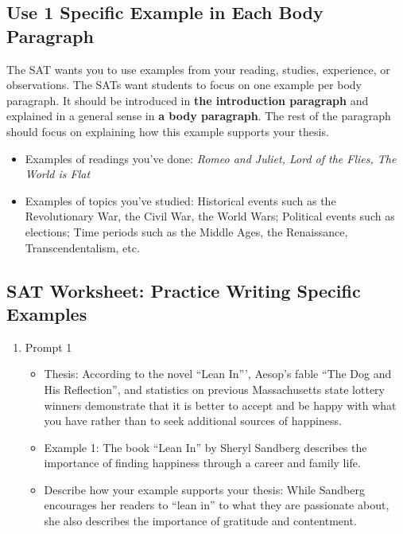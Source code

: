 \begin{enumerate}
\begin{enumerate}
\begin{itemize}
\end{itemize}

\subsection{Use 1 Specific Example in Each Body Paragraph}

The SAT wants you to use examples from your reading, studies, experience, or observations. The SATs want students to focus on one example per body paragraph. It should be introduced in \textbf{the introduction paragraph} and explained in a general sense in \textbf{a body paragraph}. The rest of the paragraph should focus on explaining how this example supports your thesis.

\begin{itemize}
\item Examples of readings you’ve done: \textit{Romeo and Juliet, Lord of the Flies, The World is Flat}
\item Examples of topics you’ve studied: Historical events such as the Revolutionary War, the Civil War, the World Wars; Political events such as elections; Time periods such as the Middle Ages, the Renaissance, Transcendentalism, etc.
\end{itemize}

\end{enumerate}

\subsection{SAT Worksheet: Practice Writing Specific Examples}
\begin{enumerate}
\item Prompt 1

\begin{itemize}
\item Thesis: According to the novel ``Lean In''', Aesop’s fable ``The Dog and His Reflection'', and statistics on previous Massachusetts state lottery winners demonstrate that it is better to accept and be happy with what you have rather than to seek additional sources of happiness. 
\item Example 1: The book ``Lean In'' by Sheryl Sandberg describes the importance of finding happiness through a career and family life. 
\item Describe how your example supports your thesis: While Sandberg encourages her readers to ``lean in'' to what they are passionate about, she also describes the importance of gratitude and contentment. 


\end{itemize}
\end{enumerate}
\end{enumerate}
